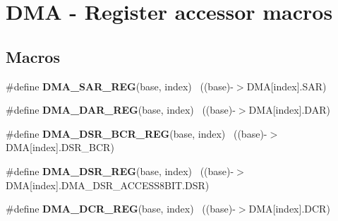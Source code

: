 \hypertarget{group___d_m_a___register___accessor___macros}{}\section{D\+M\+A -\/ Register accessor macros}
\label{group___d_m_a___register___accessor___macros}
\subsection*{Macros}
\begin{DoxyCompactItemize}
\item 
\hypertarget{group___d_m_a___register___accessor___macros_ga9b1cd25baf4f888caa6e4f96c238bbeb}{}\#define {\bfseries D\+M\+A\+\_\+\+S\+A\+R\+\_\+\+R\+E\+G}(base,  index)                                ~((base)-\/$>$D\+M\+A\mbox{[}index\mbox{]}.S\+A\+R)\label{group___d_m_a___register___accessor___macros_ga9b1cd25baf4f888caa6e4f96c238bbeb}

\item 
\hypertarget{group___d_m_a___register___accessor___macros_gaff00a31c917565930c57e5ecd9fdfd8e}{}\#define {\bfseries D\+M\+A\+\_\+\+D\+A\+R\+\_\+\+R\+E\+G}(base,  index)                                ~((base)-\/$>$D\+M\+A\mbox{[}index\mbox{]}.D\+A\+R)\label{group___d_m_a___register___accessor___macros_gaff00a31c917565930c57e5ecd9fdfd8e}

\item 
\hypertarget{group___d_m_a___register___accessor___macros_ga6de33913b70e7b2aba1c7486827daf2a}{}\#define {\bfseries D\+M\+A\+\_\+\+D\+S\+R\+\_\+\+B\+C\+R\+\_\+\+R\+E\+G}(base,  index)                        ~((base)-\/$>$D\+M\+A\mbox{[}index\mbox{]}.D\+S\+R\+\_\+\+B\+C\+R)\label{group___d_m_a___register___accessor___macros_ga6de33913b70e7b2aba1c7486827daf2a}

\item 
\hypertarget{group___d_m_a___register___accessor___macros_ga1e8cedd9bdbe33d859c60b86b0a6b3b1}{}\#define {\bfseries D\+M\+A\+\_\+\+D\+S\+R\+\_\+\+R\+E\+G}(base,  index)                                ~((base)-\/$>$D\+M\+A\mbox{[}index\mbox{]}.D\+M\+A\+\_\+\+D\+S\+R\+\_\+\+A\+C\+C\+E\+S\+S8\+B\+I\+T.\+D\+S\+R)\label{group___d_m_a___register___accessor___macros_ga1e8cedd9bdbe33d859c60b86b0a6b3b1}

\item 
\hypertarget{group___d_m_a___register___accessor___macros_ga1e1ba3e89c784e36af7e50ef3f415a2d}{}\#define {\bfseries D\+M\+A\+\_\+\+D\+C\+R\+\_\+\+R\+E\+G}(base,  index)                                ~((base)-\/$>$D\+M\+A\mbox{[}index\mbox{]}.D\+C\+R)\label{group___d_m_a___register___accessor___macros_ga1e1ba3e89c784e36af7e50ef3f415a2d}


\end{DoxyCompactItemize}
